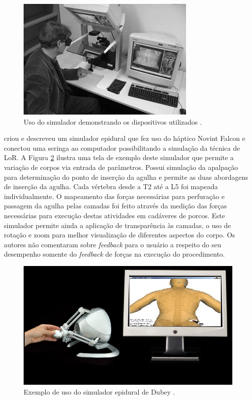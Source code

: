 \begin{figure}[ht!]
    \centering
    \includegraphics[width=0.5\linewidth]{capitulos/figuras/farberSimDispositivos.png} 
    \caption{Uso do simulador demonstrando os dispositivos utilizados \cite{Farber2009}.}
    \label{fig:farberSimDispositivos}
\end{figure}

\textcite{N.2013} criou e descreveu um simulador epidural que fez uso do háptico Novint Falcon e conectou uma seringa ao computador possibilitando a simulação da técnica de \acrshort{LoR}. A Figura \ref{fig:dubeySimSistema} ilustra uma tela de exemplo deste simulador que permite a variação de corpos via entrada de parâmetros. Possui simulação da apalpação para determinação do ponto de inserção da agulha e permite as duas abordagens de inserção da agulha. Cada vértebra desde a T2 até a L5 foi mapeada individualmente. O mapeamento das forças necessárias para perfuração e passagem da agulha pelas camadas foi feito através da medição das forças necessárias para execução destas atividades em cadáveres de porcos. Este simulador permite ainda a aplicação de transparência às camadas, o uso de rotação e zoom para melhor visualização de diferentes aspectos do corpo. Os autores não comentaram sobre \textit{feedback} para o usuário a respeito do seu desempenho somente do \textit{feedback} de forças na execução do procedimento.

\begin{figure}[ht!]
    \centering
    \includegraphics[width=0.5\linewidth]{capitulos/figuras/Dubey-ES-haptic-graphics.jpeg} 
    \caption{Exemplo de uso do simulador epidural de Dubey \cite{N.2013}.}
    \label{fig:dubeySimSistema}
\end{figure}

